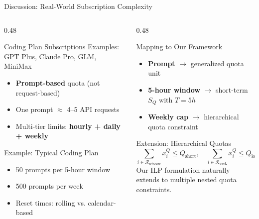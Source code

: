 \documentclass[aspectratio=169,10pt]{beamer}
\begin{document}
\begin{frame}{Discussion: Real-World Subscription Complexity}
\begin{columns}[T]
\begin{column}{0.48\textwidth}
\begin{block}{Coding Plan Subscriptions}
Examples: GPT Plus, Claude Pro, GLM, MiniMax
\begin{itemize}
    \item \textbf{Prompt-based} quota (not request-based)
    \item One prompt $\approx$ 4--5 API requests
    \item Multi-tier limits: \textbf{hourly + daily + weekly}
\end{itemize}
\end{block}

\vspace{0.2cm}
\begin{exampleblock}{Example: Typical Coding Plan}
\begin{itemize}
    \item 50 prompts per 5-hour window
    \item 500 prompts per week
    \item Reset times: rolling vs. calendar-based
\end{itemize}
\end{exampleblock}
\end{column}

\begin{column}{0.48\textwidth}
\begin{block}{Mapping to Our Framework}
\begin{itemize}
    \item \textbf{Prompt} $\rightarrow$ generalized quota unit
    \item \textbf{5-hour window} $\rightarrow$ short-term $S_Q$ with $T=5h$
    \item \textbf{Weekly cap} $\rightarrow$ hierarchical quota constraint
\end{itemize}
\end{block}

\vspace{0.2cm}
\begin{alertblock}{Extension: Hierarchical Quotas}
\[
\sum_{i \in \mathcal{R}_{\text{window}}} x_i^Q \le Q_{\text{short}}, \quad
\sum_{i \in \mathcal{R}_{\text{week}}} x_i^Q \le Q_{\text{long}}
\]
Our ILP formulation naturally extends to multiple nested quota constraints.
\end{alertblock}
\end{column}
\end{columns}
\end{frame}
\end{document}
